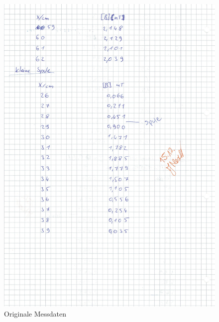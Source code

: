 \begin{figure}[h!]
  \centering
  \includegraphics[width=\textwidth]{OMD4.pdf}
  \caption{Originale Messdaten}
  \label{fig:OMD4}
\end{figure}

